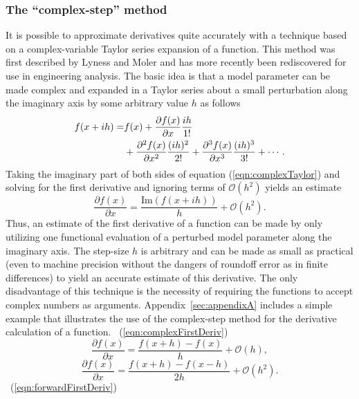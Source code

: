 \documentclass[preprint,12pt]{elsarticle}
\begin{document}
\subsubsection{The ``complex-step'' method}  
\label{sec:CSmethod} 

It is possible to approximate derivatives quite accurately with a technique based on a complex-variable Taylor series expansion of a function.  This method was first described by Lyness and Moler \cite{lyness1967numerical,lyness1968differentiation} and has more recently been rediscovered for use in engineering analysis.  The basic idea is that a model parameter can be made complex and expanded in a Taylor series about a small perturbation along the imaginary axis by some arbitrary value $h$ as follows
%
\begin{align} 
    f ( x + i h ) =& f(x) + \frac{\partial f(x)}{\partial x} \frac{i h}{1!}  \notag \\ &+ \frac{\partial^2 f(x)}{\partial x^2} \frac{(i h)^2}{2!} + \frac{\partial^3 f(x)}{\partial x^3} \frac{(i h)^3}{3!} + \cdots.
\label{eqn:complexTaylor} 
\end{align}
%
Taking the imaginary part of both sides of equation (\ref{eqn:complexTaylor}) and solving for the first derivative and ignoring terms of $\mathcal{O}\left(h^2 \right)$ yields an estimate
%
\begin{equation} \frac{\partial f( x )}{\partial x} = \frac{\mbox{Im} \left( f (x + i h) \right)}{h} +\mathcal{O}\left( h^2 \right).  
\label{eqn:complexFirstDeriv} 
\end{equation}
%
Thus, an estimate of the first derivative of a function can be made by only utilizing one functional evaluation of a perturbed model parameter along the imaginary axis.  The step-size $h$ is arbitrary and can be made as small as practical (even to machine precision without the dangers of roundoff error as in finite differences) to yield an accurate estimate of this derivative.  The only disadvantage of this technique is the necessity of requiring the functions to accept complex numbers as arguments. Appendix~\ref{sec:appendixA} includes a simple example that illustrates the use of the complex-step method for the derivative calculation of a function. 
%
 ~(\ref{eqn:complexFirstDeriv})  \cite[Chap. 4.1.3]{chapra2010}
%
\begin{equation} 
\frac{\partial f( x )}{\partial x} = \frac{f (x + h) - f (x)}{h} +\mathcal{O}\left( h \right), 
\label{eqn:forwardFirstDeriv} 
\end{equation}
%
\begin{equation} 
\frac{\partial f( x )}{\partial x} = \frac{f (x + h) - f (x - h)}{2h} +\mathcal{O}\left( h^2 \right). 
\label{eqn:centeredFirstDeriv} 
\end{equation} 
%
~(\ref{eqn:forwardFirstDeriv})
\end{document}
